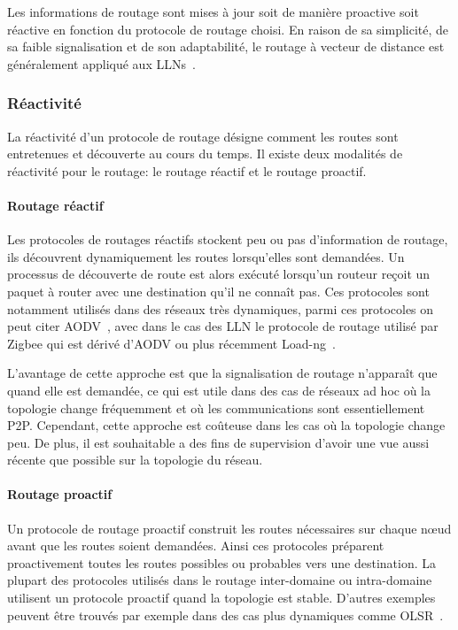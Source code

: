 Les informations de routage sont mises à jour soit de manière proactive soit réactive en fonction du protocole de routage choisi.
En raison de sa simplicité, de sa faible signalisation et de son adaptabilité, le routage à vecteur de distance est généralement appliqué aux \ac{LLN}s~\cite{rfc3561,hu2003sead,rfc6550}.

\subsubsection{Réactivité}

La réactivité d'un protocole de routage désigne comment les routes sont entretenues et découverte au cours du temps.
Il existe deux modalités de réactivité pour le routage: le routage réactif et le routage proactif.

\paragraph{Routage réactif}

Les protocoles de routages réactifs stockent peu ou pas d'information de routage, ils découvrent dynamiquement les routes lorsqu'elles sont demandées.
Un processus de découverte de route est alors exécuté lorsqu'un routeur reçoit un paquet à router avec une destination qu'il ne connaît pas.
Ces protocoles sont notamment utilisés dans des réseaux très dynamiques, parmi ces protocoles on peut citer  \ac{AODV}~\cite{rfc3561}, avec dans le cas des \ac{LLN} le protocole de routage utilisé par Zigbee qui est dérivé d'\ac{AODV} ou plus récemment Load-ng~\cite{LoadNg-draft}.

L'avantage de cette approche est que la signalisation de routage n’apparaît que quand elle est demandée, ce qui est utile dans des cas de réseaux ad hoc où la topologie change fréquemment et où les communications sont essentiellement \ac{P2P}.
Cependant, cette approche est coûteuse dans les cas où la topologie change peu.
De plus, il est souhaitable a des fins de supervision d'avoir une vue aussi récente que possible sur la topologie du réseau.

\paragraph{Routage proactif}

Un protocole de routage proactif construit les routes nécessaires sur chaque nœud avant que les routes soient demandées.
Ainsi ces protocoles préparent proactivement toutes les routes possibles ou probables vers une destination.
La plupart des protocoles utilisés dans le routage inter-domaine ou intra-domaine utilisent un protocole proactif quand la topologie est stable.
D'autres exemples peuvent être trouvés par exemple dans des cas plus dynamiques comme \ac{OLSR}~\cite{rfc3626}.

